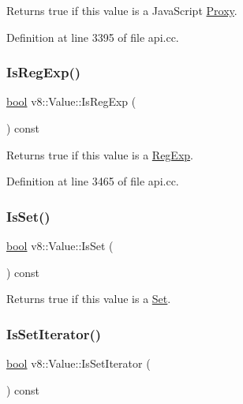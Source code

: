 Returns true if this value is a Java\+Script \mbox{\hyperlink{classv8_1_1Proxy}{Proxy}}. 

Definition at line 3395 of file api.\+cc.

\mbox{\label{classv8_1_1Value_a010aa78e7cc8e1dbb878479e534992b3}} 
\subsubsection{\texorpdfstring{Is\+Reg\+Exp()}{IsRegExp()}}
{\footnotesize\ttfamily \mbox{\hyperlink{classbool}{bool}} v8\+::\+Value\+::\+Is\+Reg\+Exp (\begin{DoxyParamCaption}{ }\end{DoxyParamCaption}) const}

Returns true if this value is a \mbox{\hyperlink{classv8_1_1RegExp}{Reg\+Exp}}. 

Definition at line 3465 of file api.\+cc.

\mbox{\label{classv8_1_1Value_a131fc14572f31efd8e2969963564abbb}} 
\subsubsection{\texorpdfstring{Is\+Set()}{IsSet()}}
{\footnotesize\ttfamily \mbox{\hyperlink{classbool}{bool}} v8\+::\+Value\+::\+Is\+Set (\begin{DoxyParamCaption}{ }\end{DoxyParamCaption}) const}

Returns true if this value is a \mbox{\hyperlink{classv8_1_1Set}{Set}}. \mbox{\label{classv8_1_1Value_a908403b5e09eb5dc0087b562b01618a4}} 
\subsubsection{\texorpdfstring{Is\+Set\+Iterator()}{IsSetIterator()}}
{\footnotesize\ttfamily \mbox{\hyperlink{classbool}{bool}} v8\+::\+Value\+::\+Is\+Set\+Iterator (\begin{DoxyParamCaption}{ }\end{DoxyParamCaption}) const}

